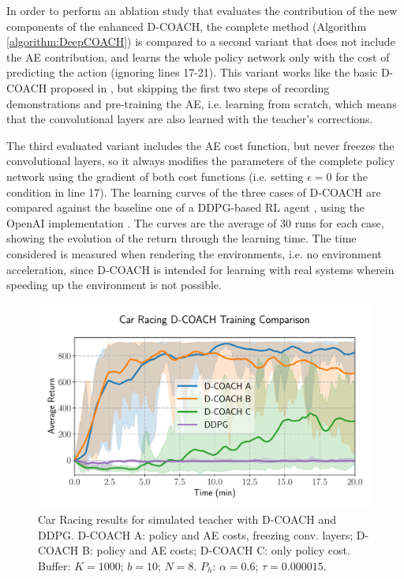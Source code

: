 In order to perform an ablation study that evaluates the contribution of the new components of the enhanced D-COACH, the complete method (Algorithm \ref{algorithm:DeepCOACH}) is compared to a second variant that does not include the AE contribution, and learns the whole policy network only with the cost of predicting the action (ignoring lines 17-21). This variant  works like the basic D-COACH proposed in \cite{perez2018interactive}, but skipping the first two steps of recording demonstrations and pre-training the AE, i.e. learning from scratch, which means that the convolutional layers are also learned with the teacher's corrections.

The third evaluated variant includes the AE cost function, but never freezes the convolutional layers, so it always modifies the parameters of the complete policy network using the gradient of both cost functions (i.e. setting $\epsilon=0$ for the condition in line 17). The learning curves of the three cases of D-COACH are compared against the baseline one of a DDPG-based RL agent \cite{Lillicrap2015}, using the OpenAI implementation \cite{baselines}. The curves are the average of 30 runs for each case, showing the evolution of the return through the learning time. The time considered is measured when rendering the environments, i.e. no environment acceleration, since D-COACH is intended for learning with real systems wherein speeding up the environment is not possible.

\begin{figure}[h]
    \centering
    \includegraphics[width=0.9\linewidth]{imagenes/cap3/car_racing_sim_ICRA.pdf}
    \caption{Car Racing results for simulated teacher with D-COACH and DDPG. D-COACH A: policy and AE costs, freezing conv. layers; D-COACH B: policy and AE costs; D-COACH C: only policy cost. Buffer: $K = 1000$; $b = 10$; $N = 8$. $P_{h}$: $\alpha = 0.6$; $\tau = 0.000015$.}
    \label{fig:racing_car_results}
\end{figure}

